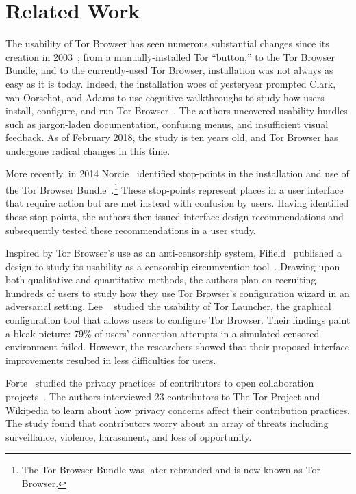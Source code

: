 \section{Related Work}
\label{sec:related-work}

The usability of Tor Browser has seen numerous substantial changes since its
creation in 2003~\cite{Syverson2005a}; from a manually-installed Tor ``button,''
to the Tor Browser Bundle, and to the currently-used Tor Browser, installation was
not always as easy as it is today. Indeed, the installation woes of yesteryear
prompted Clark, van Oorschot, and Adams 
to use cognitive walkthroughs to study how users install, configure, and run
Tor Browser~\cite{Clark2007a}.  The authors uncovered usability hurdles such as
jargon-laden documentation, confusing menus, and insufficient visual feedback.
As of February 2018, the study is ten years old, and Tor Browser has undergone
radical changes in this time.

More recently, in 2014 Norcie \ea\ identified stop-points in the
installation and use of the Tor Browser Bundle~\cite{Norcie2014a}.\footnote{The
Tor Browser Bundle was later rebranded and is now known as Tor Browser.}  These
stop-points represent places in a user interface that require action but are met
instead with confusion by users.  Having identified these stop-points, the
authors then issued interface design recommendations and subsequently tested
these recommendations in a user study.

Inspired by Tor Browser's use as an anti-censorship system, Fifield \ea\ published
a design to study its usability as a censorship circumvention
tool~\cite{Fifield2015a}.  Drawing upon both qualitative and quantitative
methods, the authors plan on recruiting hundreds of users to study how they use Tor
Browser's configuration wizard in an adversarial setting.  Lee
\ea~\cite{Lee2017a} studied the usability of Tor Launcher, the graphical
configuration tool that allows users to configure Tor Browser.  Their findings
paint a bleak picture: 79\% of users' connection attempts in a simulated
censored environment failed.  However, the researchers showed that their
proposed interface improvements resulted in less difficulties for users.

Forte \ea\ studied the privacy practices of contributors to open collaboration
projects~\cite{Forte2017a}.  The authors interviewed 23 contributors to The Tor
Project and Wikipedia to learn about how privacy concerns affect their
contribution practices.  The study found that contributors worry about an array
of threats including surveillance, violence, harassment, and loss of
opportunity.


